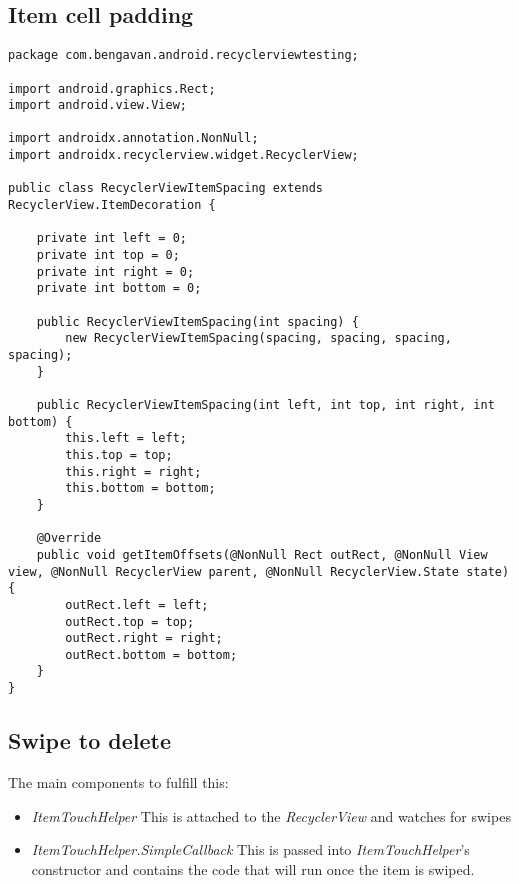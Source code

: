 \documentclass[]{article}
\renewcommand{\it}[1]{\textit{#1}}
\begin{document}
\subsection{Item cell padding}
\begin{lstlisting}
package com.bengavan.android.recyclerviewtesting;

import android.graphics.Rect;
import android.view.View;

import androidx.annotation.NonNull;
import androidx.recyclerview.widget.RecyclerView;

public class RecyclerViewItemSpacing extends RecyclerView.ItemDecoration {
	
	private int left = 0;
	private int top = 0;
	private int right = 0;
	private int bottom = 0;
	
	public RecyclerViewItemSpacing(int spacing) {
		new RecyclerViewItemSpacing(spacing, spacing, spacing, spacing);
	}
	
	public RecyclerViewItemSpacing(int left, int top, int right, int bottom) {
		this.left = left;
		this.top = top;
		this.right = right;
		this.bottom = bottom;
	}
	
	@Override
	public void getItemOffsets(@NonNull Rect outRect, @NonNull View view, @NonNull RecyclerView parent, @NonNull RecyclerView.State state) {
		outRect.left = left;
		outRect.top = top;
		outRect.right = right;
		outRect.bottom = bottom;
	}
}
\end{lstlisting}

\subsection{Swipe to delete}
The main components to fulfill this:
\begin{itemize}
	\item \it{ItemTouchHelper}
	\subitem This is attached to the \it{RecyclerView} and watches for swipes
	
	\item \it{ItemTouchHelper.SimpleCallback} 
	\subitem This is passed into \it{ItemTouchHelper}'s constructor and contains the code that will run once the item is swiped.
\end{itemize}
\end{document}
